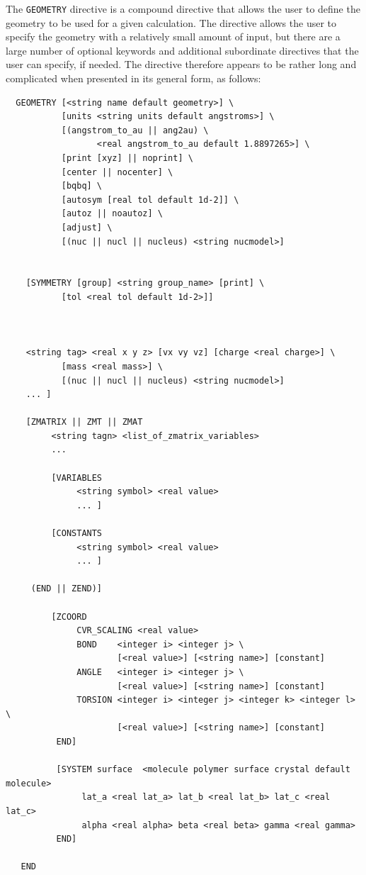 \label{sec:geom}

The \verb+GEOMETRY+ directive is a compound directive that allows the
user to define the geometry to be used for a given calculation.  The
directive allows the user to specify the geometry with a relatively
small amount of input, but there are a large number of optional
keywords and additional subordinate directives that the user can
specify, if needed.  The directive therefore appears to be rather long
and complicated when presented in its general form, as follows:
\begin{verbatim}
  GEOMETRY [<string name default geometry>] \
           [units <string units default angstroms>] \
           [(angstrom_to_au || ang2au) \
                  <real angstrom_to_au default 1.8897265>] \
           [print [xyz] || noprint] \
           [center || nocenter] \
           [bqbq] \
           [autosym [real tol default 1d-2]] \
           [autoz || noautoz] \
           [adjust] \
           [(nuc || nucl || nucleus) <string nucmodel>]
           
    
    [SYMMETRY [group] <string group_name> [print] \
           [tol <real tol default 1d-2>]]



    <string tag> <real x y z> [vx vy vz] [charge <real charge>] \
           [mass <real mass>] \
           [(nuc || nucl || nucleus) <string nucmodel>]
    ... ]

    [ZMATRIX || ZMT || ZMAT
         <string tagn> <list_of_zmatrix_variables>
         ... 

         [VARIABLES
              <string symbol> <real value>
              ... ]
 
         [CONSTANTS
              <string symbol> <real value>
              ... ]

     (END || ZEND)]

         [ZCOORD
              CVR_SCALING <real value>
              BOND    <integer i> <integer j> \
                      [<real value>] [<string name>] [constant]
              ANGLE   <integer i> <integer j> \
                      [<real value>] [<string name>] [constant]
              TORSION <integer i> <integer j> <integer k> <integer l> \
                      [<real value>] [<string name>] [constant]
          END]
          
          [SYSTEM surface  <molecule polymer surface crystal default molecule>
               lat_a <real lat_a> lat_b <real lat_b> lat_c <real lat_c>
               alpha <real alpha> beta <real beta> gamma <real gamma>
          END]
 
   END


\end{verbatim}

